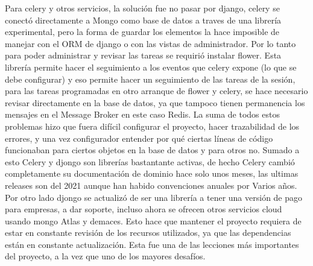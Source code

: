 Para celery y otros servicios, la solución fue no pasar por django, celery se conectó directamente a Mongo como base de datos a traves de una librería experimental, pero la forma de guardar los elementos la hace imposible de manejar con el ORM de django o con las vistas de administrador. Por lo tanto para poder administrar y revisar las tareas se requirió instalar flower. Esta librería permite hacer el seguimiento a los eventos que celery expone (lo que se debe configurar) y eso permite hacer un seguimiento de las tareas de la sesión, para las tareas programadas en otro arranque de flower y celery, se hace necesario revisar directamente en la base de datos, ya que tampoco tienen permanencia los mensajes en el Message Broker en este caso Redis.
La suma de todos estos problemas hizo que fuera difícil configurar el proyecto, hacer trazabilidad de los errores, y una vez configurador entender por qué ciertas líneas de código funcionaban para ciertos objetos en la base de datos y para otros no.
Sumado a esto Celery y djongo son librerías bastantante activas, de hecho Celery cambió completamente su documentación de dominio hace solo unos meses, las ultimas releases son del 2021 aunque han habido convenciones anuales por Varios años. Por otro lado djongo se actualizó de ser una librería a tener una versión de pago para empresas, a dar soporte, incluso ahora se ofrecen otros servicios cloud usando mongo Atlas y demaces.
Esto hace que mantener el proyecto requiera de estar en constante revisión de los recursos utilizados, ya que las dependencias están en constante actualización. Esta fue una de las lecciones más importantes del proyecto, a la vez que uno de los mayores desafíos.
